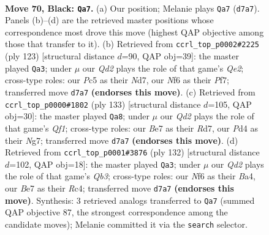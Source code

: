 \documentclass[11pt]{article}
\begin{document}
\clearpage

\begin{figure}[p]\centering
\begin{subfigure}{0.46\textwidth}\centering
\resizebox{\linewidth}{!}{%
\newchessgame
\chessboard[
  setfen={5r2/3qb1k1/5n2/P1p2p2/2Qp1Pp1/8/1R1BPK2/3N4 b - - 1 70},
  showmover=false,
  pgfstyle=straightmove, color=movearrow, markmove={d7-a7}
]}
\caption{}
\end{subfigure}\hfill
\begin{subfigure}{0.46\textwidth}\centering
\resizebox{\linewidth}{!}{%
\newchessgame
\chessboard[
  setfen={5k2/3nqpp1/1p2b2p/1P6/3QN2P/5PP1/4BK2/8 b - - 2 62},
  showmover=false,
  pgfstyle=straightmove, color=movearrow, markmove={e7-a3}
]}
\caption{}
\end{subfigure}
\\[4pt]
\begin{subfigure}{0.46\textwidth}\centering
\resizebox{\linewidth}{!}{%
\newchessgame
\chessboard[
  setfen={5qk1/3r2np/3p3R/2pP1p2/5P1P/6P1/1Q4K1/3N4 b - - 0 67},
  showmover=false,
  pgfstyle=straightmove, color=movearrow, markmove={f8-a8}
]}
\caption{}
\end{subfigure}\hfill
\begin{subfigure}{0.46\textwidth}\centering
\resizebox{\linewidth}{!}{%
\newchessgame
\chessboard[
  setfen={8/p3r1k1/P3ppb1/1P2p3/B1R1P3/1Q6/3q1PK1/8 w - - 17 67},
  showmover=false,
  pgfstyle=straightmove, color=movearrow, markmove={b3-a3}
]}
\caption{}
\end{subfigure}
\caption{\textbf{Move 70, Black: \texttt{Qa7}.} (a) Our position; Melanie plays \texttt{Qa7} (\texttt{d7a7}). Panels (b)--(d) are the retrieved master positions whose correspondence most drove this move (highest QAP objective among those that transfer to it). (b) Retrieved from \texttt{ccrl\_top\_p0002\#2225} (ply 123) [structural distance $d$=90, QAP obj=39]: the master played \texttt{Qa3}; under $\mu$ our \emph{Qd2} plays the role of that game's \emph{Qe2}; cross-type roles: our \emph{P}c5 as their \emph{N}d7, our \emph{N}f6 as their \emph{P}f7; transferred move \texttt{d7a7} \textbf{(endorses this move)}. (c) Retrieved from \texttt{ccrl\_top\_p0000\#1802} (ply 133) [structural distance $d$=105, QAP obj=30]: the master played \texttt{Qa8}; under $\mu$ our \emph{Qd2} plays the role of that game's \emph{Qf1}; cross-type roles: our \emph{B}e7 as their \emph{R}d7, our \emph{P}d4 as their \emph{N}g7; transferred move \texttt{d7a7} \textbf{(endorses this move)}. (d) Retrieved from \texttt{ccrl\_top\_p0001\#3876} (ply 132) [structural distance $d$=102, QAP obj=18]: the master played \texttt{Qa3}; under $\mu$ our \emph{Qd2} plays the role of that game's \emph{Qb3}; cross-type roles: our \emph{N}f6 as their \emph{B}a4, our \emph{B}e7 as their \emph{R}c4; transferred move \texttt{d7a7} \textbf{(endorses this move)}. Synthesis: 3 retrieved analogs transferred to \texttt{Qa7} (summed QAP objective 87, the strongest correspondence among the candidate moves); Melanie committed it via the \texttt{search} selector.}
\label{fig:thought-m139}
\end{figure}
\end{document}
